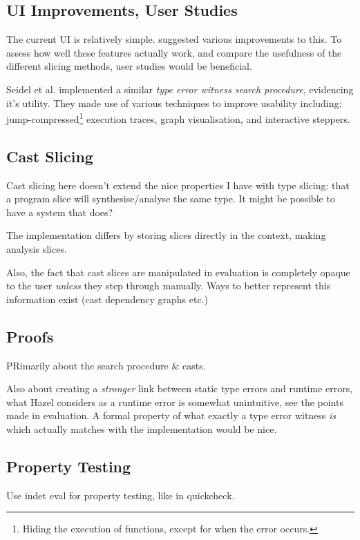\subsection{UI Improvements, User Studies}
The current UI is relatively simple.  suggested various improvements to this. To assess how well these features actually work, and compare the usefulness of the different slicing methods, user studies would be beneficial.

Seidel et al. \cite{SearchProc} implemented a similar \textit{type error witness search procedure}, evidencing it's utility. They made use of various techniques to improve usability including: jump-compressed\footnote{Hiding the execution of functions, except for when the error occurs.} execution traces, graph visualisation, and interactive steppers.

\subsection{Cast Slicing}
Cast slicing here doesn't extend the nice properties I have with type slicing: that a program slice will synthesise/analyse the same type. It might be possible to have a system that does?

The implementation differs by storing slices directly in the context, making analysis slices.

Also, the fact that cast slices are manipulated in evaluation is completely opaque to the user \textit{unless} they step through manually. Ways to better represent this information exist (cast dependency graphs etc.)

\subsection{Proofs}
PRimarily about the search procedure \& casts. 

Also about creating a \textit{stronger} link between static type errors and runtime errors, what Hazel considers as a runtime error is somewhat unintuitive, see the points made in evaluation. A formal property of what exactly a type error witness \textit{is} which actually matches with the implementation would be nice.

\subsection{Property Testing}
Use indet eval for property testing, like in quickcheck.

